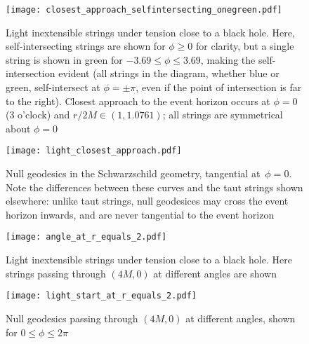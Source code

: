 \documentclass[review]{elsarticle}
\begin{document}
\begin{figure}[p] %
\centering
\texttt{[image: closest\_approach\_selfintersecting\_onegreen.pdf]}

\caption{Light inextensible strings under tension close to a black
  hole.  Here, self-intersecting strings are shown for $\phi\geqslant
  0$ for clarity, but a single string is shown in green for
  $-3.69\leqslant\phi\leqslant 3.69$, making the self-intersection
  evident (all strings in the diagram, whether blue or green,
  self-intersect at $\phi=\pm\pi$, even if the point of intersection
  is far to the right).  Closest approach to the event horizon occurs
  at $\phi=0$ (3 o'clock) and $r/2M\in\left(1,1.0761\right)$; all
  strings are symmetrical about $\phi=0$}
\label{closest_approach_self_intersecting}
\end{figure}

\begin{figure}[p] %
\centering
\texttt{[image: light\_closest\_approach.pdf]}
\caption{Null geodesics in the Schwarzschild geometry, tangential
  at~$\phi=0$.  Note the differences between these curves and the taut
  strings shown elsewhere: unlike taut strings, null geodesices may
  cross the event horizon inwards, and are never tangential to the
  event horizon}
\label{light_closest_approach}
\end{figure}

\begin{figure}[p]
\centering
\texttt{[image: angle\_at\_r\_equals\_2.pdf]} %
\caption{Light inextensible strings under tension close to a black
  hole.  Here strings passing through $(4M,0)$ at different angles are
  shown}
\label{strings_r_equals_2}
\end{figure}

\begin{figure}[p]
\centering
\texttt{[image: light\_start\_at\_r\_equals\_2.pdf]} %
\caption{Null geodesics passing through $(4M,0)$ at different angles,
  shown for $0\leqslant\phi\leqslant 2\pi$}
\label{light_r_equals_2}
\end{figure}
\end{document}
